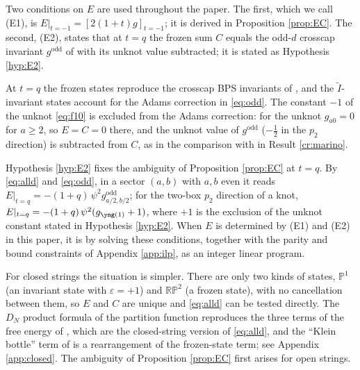 Two conditions on $E$ are used throughout the paper. The first, which we call (E1), is $E|_{t=-1} = [2(1+t)g]_{t=-1}$; it is derived in Proposition \ref{prop:EC}. The second, (E2), states that at $t = q$ the frozen sum $C$ equals the odd-$d$ crosscap invariant $g^{\mathrm{odd}}$ of \cite{Marino09} with its unknot value subtracted; it is stated as Hypothesis \ref{hyp:E2}.
\begin{hypothesis}\label{hyp:E2}
At $t = q$ the frozen states reproduce the crosscap BPS invariants of \cite{Marino09}, and the $\tilde I$-invariant states account for the Adams correction in \eqref{eq:odd}. The constant $-1$ of the unknot \eqref{eq:f10} is excluded from the Adams correction: for the unknot $g_{a0} = 0$ for $a \ge 2$, so $E = C = 0$ there, and the unknot value of $g^{\mathrm{odd}}$ ($-\tfrac12$ in the $p_2$ direction) is subtracted from $C$, as in the comparison with \cite{Marino09} in Result \ref{cr:marino}.
\end{hypothesis}
Hypothesis \ref{hyp:E2} fixes the ambiguity of Proposition \ref{prop:EC} at $t = q$. By \eqref{eq:alld} and \eqref{eq:odd}, in a sector $(a,b)$ with $a, b$ even it reads $E|_{t=q} = -(1+q)\,\psi^2 g^{\mathrm{odd}}_{a/2,b/2}$; for the two-box $p_2$ direction of a knot, $E|_{t=q} = -(1+q)\,\psi^2(g_{\yone} + 1)$, where $+1$ is the exclusion of the unknot constant stated in Hypothesis \ref{hyp:E2}. When $E$ is determined by (E1) and (E2) in this paper, it is by solving these conditions, together with the parity and bound constraints of Appendix \ref{app:ilp}, as an integer linear program.

For closed strings the situation is simpler. There are only two kinds of states, $\mathbb{P}^1$ (an invariant state with $\varepsilon = +1$) and $\mathbb{RP}^2$ (a frozen state), with no cancellation between them, so $E$ and $C$ are unique and \eqref{eq:alld} can be tested directly. The $D_N$ product formula of the partition function reproduces the three terms of the free energy of \cite{AgSc12}, which are the closed-string version of \eqref{eq:alld}, and the ``Klein bottle'' term of \cite{AM22} is a rearrangement of the frozen-state term; see Appendix \ref{app:closed}. The ambiguity of Proposition \ref{prop:EC} first arises for open strings.

